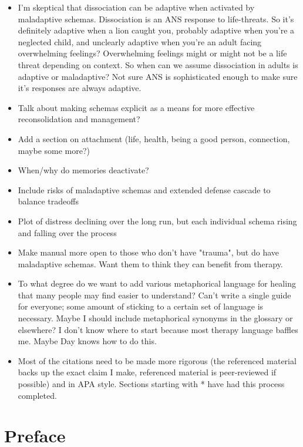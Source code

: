 \documentclass[12pt,letterpaper]{article}
\begin{document}
\begin{itemize}
    \item I'm skeptical that dissociation can be adaptive when activated by maladaptive schemas. Dissociation is an ANS response to life-threats. So it's definitely adaptive when a lion caught you, probably adaptive when you're a neglected child, and unclearly adaptive when you're an adult facing overwhelming feelings? Overwhelming feelings might or might not be a life threat depending on context. So when can we assume dissociation in adults is adaptive or maladaptive? Not sure ANS is sophisticated enough to make sure it's responses are always adaptive.
    \item Talk about making schemas explicit as a means for more effective reconsolidation and management?
    \item Add a section on attachment (life, health, being a good person, connection, maybe some more?)
    \item When/why do memories deactivate?
    \item Include risks of maladaptive schemas and extended defense cascade to balance tradeoffs
    \item Plot of distress declining over the long run, but each individual schema rising and falling over the process
    \item Make manual more open to those who don't have "trauma", but do have maladaptive schemas. Want them to think they can benefit from therapy.
    \item To what degree do we want to add various metaphorical language for healing that many people may find easier to understand? Can't write a single guide for everyone; some amount of sticking to a certain set of language is necessary. Maybe I should include metaphorical synonyms in the glossary or elsewhere? I don't know where to start because most therapy language baffles me. Maybe Day knows how to do this.
    \item Most of the citations need to be made more rigorous (the referenced material backs up the exact claim I make, referenced material is peer-reviewed if possible) and in APA style. Sections starting with * have had this process completed.
\end{itemize}
\section*{Preface}
\end{document}

